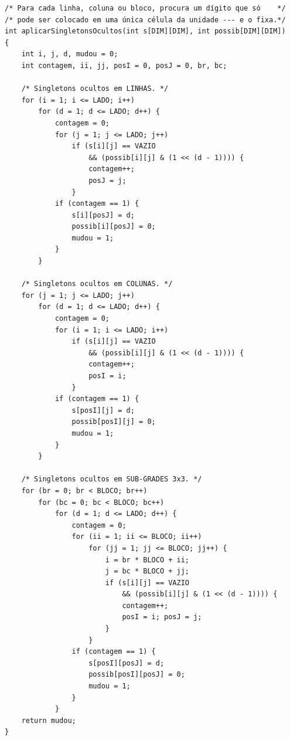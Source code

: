 \documentclass[11pt,a4paper,oneside]{report}
\begin{document}
\begin{lstlisting}[caption={Aplicação dos singletons ocultos.},label={lst:singleton_oculto}]
/* Para cada linha, coluna ou bloco, procura um dígito que só    */
/* pode ser colocado em uma única célula da unidade --- e o fixa.*/
int aplicarSingletonsOcultos(int s[DIM][DIM], int possib[DIM][DIM])
{
    int i, j, d, mudou = 0;
    int contagem, ii, jj, posI = 0, posJ = 0, br, bc;

    /* Singletons ocultos em LINHAS. */
    for (i = 1; i <= LADO; i++)
        for (d = 1; d <= LADO; d++) {
            contagem = 0;
            for (j = 1; j <= LADO; j++)
                if (s[i][j] == VAZIO
                    && (possib[i][j] & (1 << (d - 1)))) {
                    contagem++;
                    posJ = j;
                }
            if (contagem == 1) {
                s[i][posJ] = d;
                possib[i][posJ] = 0;
                mudou = 1;
            }
        }

    /* Singletons ocultos em COLUNAS. */
    for (j = 1; j <= LADO; j++)
        for (d = 1; d <= LADO; d++) {
            contagem = 0;
            for (i = 1; i <= LADO; i++)
                if (s[i][j] == VAZIO
                    && (possib[i][j] & (1 << (d - 1)))) {
                    contagem++;
                    posI = i;
                }
            if (contagem == 1) {
                s[posI][j] = d;
                possib[posI][j] = 0;
                mudou = 1;
            }
        }

    /* Singletons ocultos em SUB-GRADES 3x3. */
    for (br = 0; br < BLOCO; br++)
        for (bc = 0; bc < BLOCO; bc++)
            for (d = 1; d <= LADO; d++) {
                contagem = 0;
                for (ii = 1; ii <= BLOCO; ii++)
                    for (jj = 1; jj <= BLOCO; jj++) {
                        i = br * BLOCO + ii;
                        j = bc * BLOCO + jj;
                        if (s[i][j] == VAZIO
                            && (possib[i][j] & (1 << (d - 1)))) {
                            contagem++;
                            posI = i; posJ = j;
                        }
                    }
                if (contagem == 1) {
                    s[posI][posJ] = d;
                    possib[posI][posJ] = 0;
                    mudou = 1;
                }
            }
    return mudou;
}
\end{lstlisting}
\end{document}
